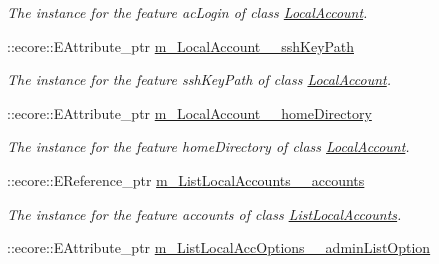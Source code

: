 \begin{DoxyCompactItemize}
\begin{DoxyCompactList}\small\item\em The instance for the feature acLogin of class \hyperlink{classUMS__Data_1_1LocalAccount}{LocalAccount}. \item\end{DoxyCompactList}\item 
\hypertarget{classUMS__Data_1_1UMS__DataPackage_a64c4543e523ad7ee6f094ae321df22ec}{
::ecore::EAttribute\_\-ptr \hyperlink{classUMS__Data_1_1UMS__DataPackage_a64c4543e523ad7ee6f094ae321df22ec}{m\_\-LocalAccount\_\-\_\-sshKeyPath}}
\label{classUMS__Data_1_1UMS__DataPackage_a64c4543e523ad7ee6f094ae321df22ec}

\begin{DoxyCompactList}\small\item\em The instance for the feature sshKeyPath of class \hyperlink{classUMS__Data_1_1LocalAccount}{LocalAccount}. \item\end{DoxyCompactList}\item 
\hypertarget{classUMS__Data_1_1UMS__DataPackage_ad5a88b2c8f942eecea9eecaec6a225a2}{
::ecore::EAttribute\_\-ptr \hyperlink{classUMS__Data_1_1UMS__DataPackage_ad5a88b2c8f942eecea9eecaec6a225a2}{m\_\-LocalAccount\_\-\_\-homeDirectory}}
\label{classUMS__Data_1_1UMS__DataPackage_ad5a88b2c8f942eecea9eecaec6a225a2}

\begin{DoxyCompactList}\small\item\em The instance for the feature homeDirectory of class \hyperlink{classUMS__Data_1_1LocalAccount}{LocalAccount}. \item\end{DoxyCompactList}\item 
\hypertarget{classUMS__Data_1_1UMS__DataPackage_a14dfe8ea061c837965158c8c5ee1ce64}{
::ecore::EReference\_\-ptr \hyperlink{classUMS__Data_1_1UMS__DataPackage_a14dfe8ea061c837965158c8c5ee1ce64}{m\_\-ListLocalAccounts\_\-\_\-accounts}}
\label{classUMS__Data_1_1UMS__DataPackage_a14dfe8ea061c837965158c8c5ee1ce64}

\begin{DoxyCompactList}\small\item\em The instance for the feature accounts of class \hyperlink{classUMS__Data_1_1ListLocalAccounts}{ListLocalAccounts}. \item\end{DoxyCompactList}\item 
\hypertarget{classUMS__Data_1_1UMS__DataPackage_a7d760901283b6c97bc7f994e4975e1de}{
::ecore::EAttribute\_\-ptr \hyperlink{classUMS__Data_1_1UMS__DataPackage_a7d760901283b6c97bc7f994e4975e1de}{m\_\-ListLocalAccOptions\_\-\_\-adminListOption}}
\label{classUMS__Data_1_1UMS__DataPackage_a7d760901283b6c97bc7f994e4975e1de}


\end{DoxyCompactItemize}
